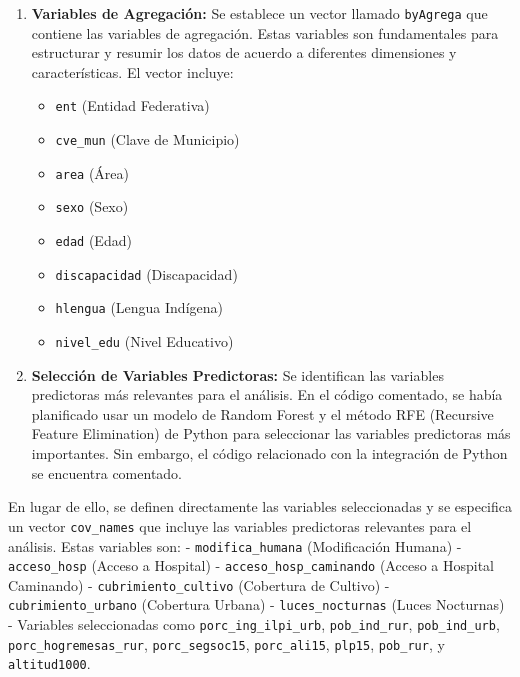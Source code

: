 \documentclass[
  12pt,
]{book}
\providecommand{\tightlist}{%
  \setlength{\itemsep}{0pt}\setlength{\parskip}{0pt}}
\begin{document}
\begin{enumerate}
\def\labelenumi{\arabic{enumi}.}
\tightlist
\item
  \textbf{Variables de Agregación:} Se establece un vector llamado \texttt{byAgrega} que contiene las variables de agregación. Estas variables son fundamentales para estructurar y resumir los datos de acuerdo a diferentes dimensiones y características. El vector incluye:

  \begin{itemize}
  \tightlist
  \item
    \texttt{ent} (Entidad Federativa)
  \item
    \texttt{cve\_mun} (Clave de Municipio)
  \item
    \texttt{area} (Área)
  \item
    \texttt{sexo} (Sexo)
  \item
    \texttt{edad} (Edad)
  \item
    \texttt{discapacidad} (Discapacidad)
  \item
    \texttt{hlengua} (Lengua Indígena)
  \item
    \texttt{nivel\_edu} (Nivel Educativo)
  \end{itemize}
\item
  \textbf{Selección de Variables Predictoras:} Se identifican las variables predictoras más relevantes para el análisis. En el código comentado, se había planificado usar un modelo de Random Forest y el método RFE (Recursive Feature Elimination) de Python para seleccionar las variables predictoras más importantes. Sin embargo, el código relacionado con la integración de Python se encuentra comentado.
\end{enumerate}

En lugar de ello, se definen directamente las variables seleccionadas y se especifica un vector \texttt{cov\_names} que incluye las variables predictoras relevantes para el análisis. Estas variables son:
- \texttt{modifica\_humana} (Modificación Humana)
- \texttt{acceso\_hosp} (Acceso a Hospital)
- \texttt{acceso\_hosp\_caminando} (Acceso a Hospital Caminando)
- \texttt{cubrimiento\_cultivo} (Cobertura de Cultivo)
- \texttt{cubrimiento\_urbano} (Cobertura Urbana)
- \texttt{luces\_nocturnas} (Luces Nocturnas)
- Variables seleccionadas como \texttt{porc\_ing\_ilpi\_urb}, \texttt{pob\_ind\_rur}, \texttt{pob\_ind\_urb}, \texttt{porc\_hogremesas\_rur}, \texttt{porc\_segsoc15}, \texttt{porc\_ali15}, \texttt{plp15}, \texttt{pob\_rur}, y \texttt{altitud1000}.
\end{document}
